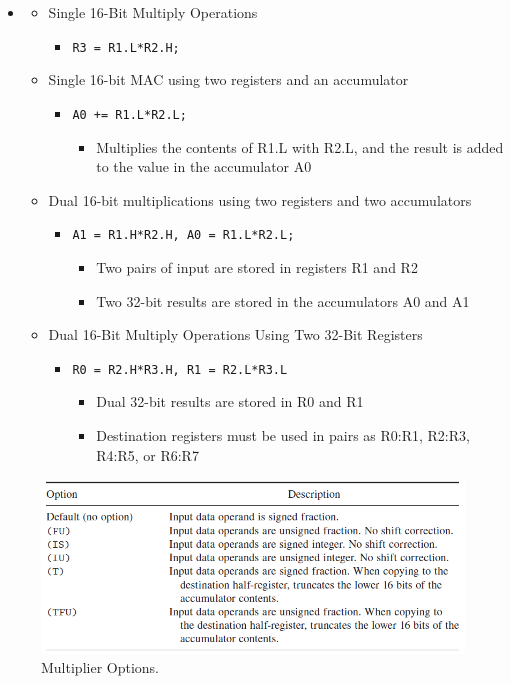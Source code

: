 \begin{itemize}
	\item[] 
	\begin{itemize}
		\item Single 16-Bit Multiply Operations
		\begin{itemize}
			\item \texttt{R3 = R1.L*R2.H;}
		\end{itemize}
		\item Single 16-bit MAC using two registers and an accumulator
		\begin{itemize}
			\item \texttt{A0 += R1.L*R2.L;}
			\begin{itemize}
				\item Multiplies the contents of R1.L with R2.L, and the result is added to the value in the accumulator A0
			\end{itemize}
		\end{itemize}
		\item Dual 16-bit multiplications using two registers and two accumulators
		\begin{itemize}
			\item \texttt{A1 = R1.H*R2.H, A0 = R1.L*R2.L;}
			\begin{itemize}
				\item Two pairs of input are stored in registers R1 and R2
				\item Two 32-bit results are stored in the accumulators A0 and A1
			\end{itemize}
		\end{itemize}
		\item Dual 16-Bit Multiply Operations Using Two 32-Bit Registers
		\begin{itemize}
			\item \texttt{R0 = R2.H*R3.H, R1 = R2.L*R3.L}
			\begin{itemize}
				\item Dual 32-bit results are stored in R0 and R1
				\item Destination registers must be used in pairs as R0:R1, R2:R3, R4:R5, or R6:R7
			\end{itemize}
		\end{itemize}
	\end{itemize}
\end{itemize}


\begin{figure} [H]
	\centering
	\includegraphics[width=\linewidth]{graphics/4.png}
	\caption{Multiplier Options.}
	\label{fig:4}
\end{figure}


